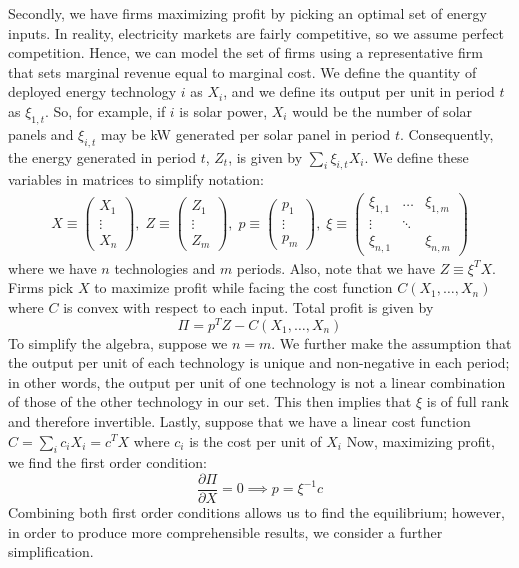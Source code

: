 \documentclass[11pt,a4paper]{extarticle}
\begin{document}
Secondly, we have firms maximizing profit by picking an optimal set of energy inputs. In reality, electricity markets are fairly competitive, so we assume perfect competition. Hence, we can model the set of firms using a representative firm that sets marginal revenue equal to marginal cost. We define the quantity of deployed energy technology $i$ as $X_i$, and we define its output per unit in period $t$ as $\xi_{1,t}$. So, for example, if $i$ is solar power, $X_i$ would be the number of solar panels and $\xi_{i,t}$ may be kW generated per solar panel in period $t$. Consequently, the energy generated in period $t$, $Z_t$, is given by $\sum_i \xi_{i,t} X_i$. We define these variables in matrices to simplify notation:
\begin{align*}
X \equiv \begin{pmatrix}
X_1\\
\vdots\\
X_n
\end{pmatrix} ,\;
Z \equiv \begin{pmatrix}
Z_1\\
\vdots\\
Z_m
\end{pmatrix} ,\;
p \equiv \begin{pmatrix}
p_1\\
\vdots\\
p_m
\end{pmatrix} ,\;
\xi \equiv \begin{pmatrix}
\xi_{1,1} & \dots & \xi_{1,m}\\
\vdots & \ddots & \\
\xi_{n,1} &  & \xi_{n,m}
\end{pmatrix} 
\end{align*}
where we have $n$ technologies and  $m$ periods. Also, note that we have $Z \equiv \xi^T X$. Firms pick $X$ to maximize profit while facing the cost function $C(X_1, \dots, X_n)$ where $C$ is convex with respect to each input. Total profit is given by 
\begin{equation}
\Pi = p^T Z - C(X_1, \dots, X_n)
\end{equation}
To simplify the algebra, suppose we $n=m$. We further make the assumption that the output per unit of each technology is unique and non-negative in each period; in other words, the output per unit of one technology is not a linear combination of those of the other technology in our set. This then implies that $\xi$ is of full rank and therefore invertible. Lastly, suppose that we have a linear cost function $C = \sum_i c_i X_i = c^T X$ where $c_i$ is the cost per unit of $X_i$ Now, maximizing profit, we find the first order condition:
\begin{equation}
\frac{\partial \Pi}{\partial X} = 0 \implies p = \xi^{-1} c
\end{equation}
Combining both first order conditions allows us to find the equilibrium; however, in order to produce more comprehensible results, we consider a further simplification. 
\end{document}
